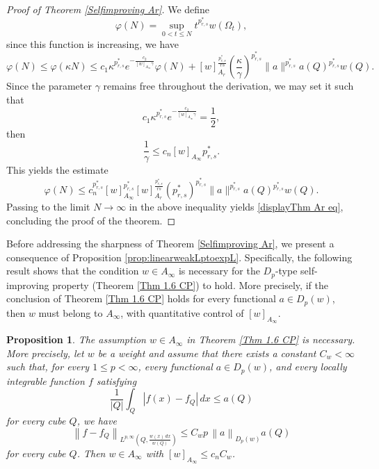 \documentclass[reqno, 10pt, oneside]{amsart}
\numberwithin{equation}{section}
\newtheorem{proposition}[theorem]{Proposition}
\numberwithin{theorem}{section}
\newcommand{\1}{{\rm 1\hspace*{-0.4ex}%
\rule{0.1ex}{1.52ex}\hspace*{0.2ex}}}
\begin{document}
\begin{proof}[Proof of Theorem \ref{Selfimproving Ar}]
We define
\begin{equation*}
	\varphi(N) = \sup_{0<t\leq N} t^{p_{r,s}^{*}} w(\Omega_t),
\end{equation*}
since this function is increasing, we have
\begin{equation*}
	\varphi(N) \leq \varphi(\kappa N) \leq c_1 \kappa^{p_{r,s}^{*}} e^{-\frac{c_2}{ [w]_{A_{\infty}} \gamma} }\varphi(N) + 
[w]_{A_r}^{\frac{p_{r,s}^{*}}{rs}} \left( \frac{\kappa}{\gamma}\right)^{p_{r,s}^{*}} \|a\|^{p_{r,s}^{*}}a(Q)^{p_{r,s}^{*}} w(Q).
\end{equation*}
%
Since the parameter $\gamma$ remains free throughout the derivation, we may set it such that  
\begin{equation*}
		c_1 \kappa^{p_{r,s}^{*}} e^{-\frac{c_2}{[w]_{A_{\infty}}\gamma}}=\frac 12,\end{equation*}
then 
\begin{equation*}
	\frac1{\gamma} \le   c_n[w]_{A_\infty} p_{r,s}^{*}.
\end{equation*}
This yields the estimate
\begin{equation*}
	\varphi(N) \le c_n^{p_{r,s}^{*}}[w]_{A_\infty}^{p_{r,s}^{*}}[w]_{A_r}^{\frac{p_{r,s}^{*}}{rs}}  ({p_{r,s}^{*}})^{p_{r,s}^{*}} \|a\|^{p_{r,s}^{*}}a(Q)^{p_{r,s}^{*}} w(Q).
\end{equation*}
%
Passing to the limit $N \to \infty$ in the above inequality yields \eqref{displayThm Ar eq}, concluding the proof of the theorem.
\end{proof}


Before addressing the sharpness of Theorem \ref{Selfimproving Ar}, we present a consequence of Proposition \ref{prop:linearweakLptoexpL}. Specifically, the following result shows that the condition $w\in A_\infty$ is necessary for the $D_p$-type self-improving property (Theorem \ref{Thm 1.6 CP}) to hold. More precisely, if the conclusion of Theorem \ref{Thm 1.6 CP} holds for every functional $a\in D_p(w)$, then $w$ must belong to $A_\infty$, with quantitative control of $[w]_{A_\infty}$.



\begin{proposition}\label{prop:Ainfty-necessity-CP}
	The assumption $w\in A_\infty$ in Theorem \ref{Thm 1.6 CP} is necessary. More precisely, let $w$ be a weight and assume that there exists a constant $C_w<\infty$ such that, for every $1\le p<\infty$, every functional $a\in D_p(w)$, and every locally integrable function $f$ satisfying
	\begin{equation*}
		\frac{1}{|Q|}\int_Q |f(x)-f_Q|\,dx \le a(Q)
	\end{equation*}
	for every cube $Q$, we have
	\begin{equation}\label{eq:CPnecessity-Ainfty}
		\left\| f-f_Q\right\|_{ L^{p,\infty}\left(Q,\frac{w(x)\,dx}{w(Q)}\right)}
		\le C_w p\, \left\|a\right\|_{D_p(w)} a(Q)
	\end{equation}
	for every cube $Q$. Then $w\in A_\infty$ with $[w]_{A_\infty}\le c_n C_w$.
\end{proposition}
\end{document}
